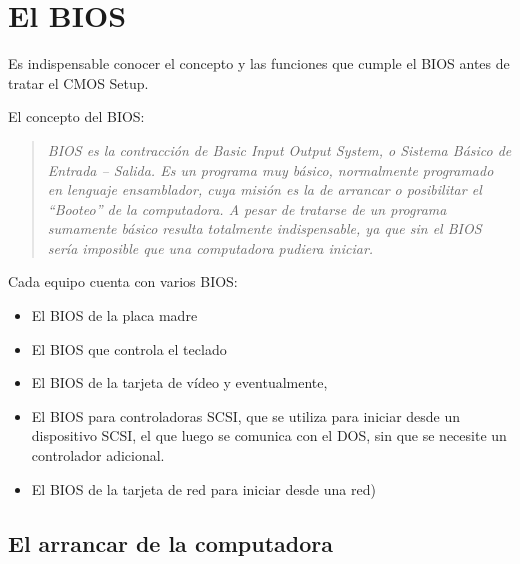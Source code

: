\documentclass[12pt,oneside,a4paper]{article}
\begin{document}
	\newpage

\section{El BIOS}{\label{sec:bios}}

Es indispensable conocer el concepto y las funciones que cumple el BIOS antes de tratar el CMOS Setup.

El concepto del BIOS:
\begin{quotation}

	{\em BIOS es la contracción de Basic Input Output System, o Sistema Básico de
	Entrada – Salida. 
	Es un programa muy básico, normalmente programado en lenguaje ensamblador,
	cuya misión es la de arrancar o posibilitar el “Booteo” de la computadora.
	A pesar de tratarse de un programa sumamente básico resulta totalmente
	indispensable, ya que sin el BIOS sería imposible que una computadora pudiera
	iniciar.}

\end{quotation}

Cada equipo cuenta con varios BIOS: 
\begin{itemize}
	\item El BIOS de la placa madre 
	\item El BIOS que controla el teclado 
	\item El BIOS de la tarjeta de vídeo y eventualmente, 
	\item El BIOS para controladoras SCSI, que se utiliza para iniciar
		desde un dispositivo SCSI, el que luego se comunica con el DOS, sin
		que se necesite un controlador adicional. 
	\item El BIOS de la tarjeta de red para iniciar desde una red) 
\end{itemize}

	\subsection{El arrancar de la computadora}{\label{sec:bios/arranque}}
\end{document}
